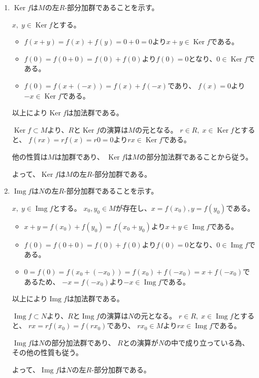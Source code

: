 \documentclass[12pt,b5paper]{ltjsarticle}
\newcommand{\Ker}{\mathop{\mathrm{Ker}}\nolimits}
\newcommand{\Img}{\mathop{\mathrm{Img}}\nolimits}
\begin{document}
\dotfill

\begin{enumerate}
 \item $\Ker{f}$は$M$の左$R$-部分加群であることを示す。

       $x,\;y\in\Ker{f}$とする。
       \begin{itemize}
        \item $f(x+y)=f(x)+f(y)=0+0=0$より$x + y\in\Ker{f}$である。
        \item $f(0)=f(0+0)=f(0)+f(0)$より$f(0)=0$となり、$0\in\Ker{f}$である。
        \item $f(0)=f(x+(-x))=f(x)+f(-x)$であり、
              $f(x)=0$より$-x\in\Ker{f}$である。
       \end{itemize}
       以上により$\Ker{f}$は加法群である。

       $\Ker{f} \subset M$より、$R$と$\Ker{f}$の演算は$M$の元となる。
       $r\in R,\; x\in\Ker{f}$とすると、
       $f(rx)=rf(x)=r0=0$より$rx\in\Ker{f}$である。

       他の性質は$M$は加群であり、
       $\Ker{f}$は$M$の部分加法群であることから従う。

       よって、$\Ker{f}$は$M$の左$R$-部分加群である。

 \item $\Img{f}$は$N$の左$R$-部分加群であることを示す。

       $x,\;y\in\Img{f}$とする。
       $x_{0},y_{0}\in M$が存在し、$x=f(x_{0}),y=f(y_{0})$である。
       \begin{itemize}
        \item $x+y=f(x_{0})+f(y_{0})=f(x_{0}+y_{0})$より$x + y\in\Img{f}$である。
        \item $f(0)=f(0+0)=f(0)+f(0)$より$f(0)=0$となり、$0\in\Img{f}$である。
        \item $0=f(0)=f(x_{0}+(-x_{0}))=f(x_{0})+f(-x_{0})=x+f(-x_{0})$であるため、
              $-x=f(-x_{0})$より$-x\in\Img{f}$である。
       \end{itemize}
       以上により$\Img{f}$は加法群である。

       $\Img{f} \subset N$より、$R$と$\Img{f}$の演算は$N$の元となる。
       $r\in R,\; x\in\Img{f}$とすると、
       $rx=rf(x_{0})=f(rx_{0})$であり、
       $rx_{0}\in M$より$rx\in\Img{f}$である。

       $\Img{f}$は$N$の部分加法群であり、
       $R$との演算が$N$の中で成り立っている為、
       その他の性質も従う。

       よって、$\Img{f}$は$N$の左$R$-部分加群である。
\end{enumerate}
\end{document}
